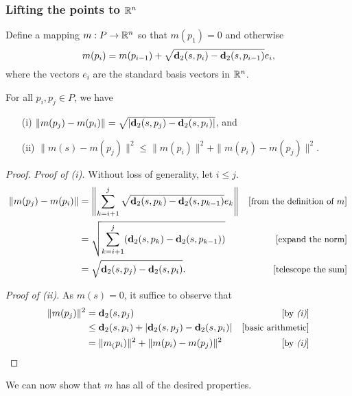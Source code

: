 \subsubsection{Lifting the points to $\mathbb{R}^n$} %
\label{sec:lifting}
  
  Define a mapping $m: P \to \mathbb{R}^n$ so that $m(p_1) = 0$ and otherwise 
  \begin{equation}\label{eq:defn_of_m}
    m(p_i) = m(p_{i-1}) + \sqrt{\mathbf{d}_2(s, p_i) - \mathbf{d}_2(s, p_{i-1})} e_i,
  \end{equation}
  where the vectors $e_i$ are the standard basis vectors in $\mathbb{R}^n$.

  \begin{lemma}\label{lem:m_and_dist}
    For all $p_i, p_j\in P$, we have 
    \begin{enumerate}
      \item[(i)] $\|m(p_j) - m(p_i)\| = \sqrt{|\mathbf{d}_2(s,p_j) - \mathbf{d}_2(s,p_i)|}$, and
      \item[(ii)]$\|m(s) - m(p_j)\|^2 \le \|m(p_i)\|^2 + \|m(p_i) - m(p_j)\|^2$.
    \end{enumerate}
  \end{lemma}
  \begin{proof}
    \emph{Proof of (i).}
    Without loss of generality, let $i \le j$.
    \begin{align*}
      \|m(p_j) - m(p_i)\| &= \left\|\sum_{k=i+1}^j \sqrt{\mathbf{d}_2(s, p_k) - \mathbf{d}_2(s, p_{k-1})} e_k \right\| &\left[\text{\small{from the definition of $m$}}\right]\\
      &= \sqrt{\sum_{k=i+1}^j (\mathbf{d}_2(s, p_k) - \mathbf{d}_2(s, p_{k-1}))}&\left[\text{\small{expand the norm}}\right]\\
      &= \sqrt{\mathbf{d}_2(s, p_j) - \mathbf{d}_2(s, p_i)}. &\left[\text{\small{telescope the sum}}\right]
    \end{align*}

    \noindent\emph{Proof of (ii).}
    As $m(s) = 0$, it suffice to observe that
    \begin{align*}
      \|m(p_j)\|^2
        &= \mathbf{d}_2(s, p_j) &\left[\text{\small{by \emph{(i)}}}\right]\\
        &\le \mathbf{d}_2(s, p_i) + |\mathbf{d}_2(s,p_j) - \mathbf{d}_2(s,p_i)|&\left[\text{\small{basic arithmetic}}\right]\\
        &= \|m_(p_i)\|^2 + \|m(p_i) - m(p_j)\|^2 &\left[\text{\small{by \emph{(i)}}}\right]
    \end{align*}
  \end{proof}

  We can now show that $m$ has all of the desired properties.

